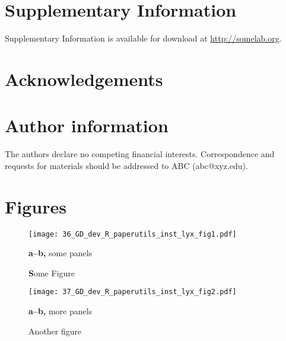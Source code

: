 \documentclass[11pt,british,super,sort&compress]{article}
\begin{document}
\section{Supplementary Information}

Supplementary Information is available for download at \url{http://somelab.org}.


\section{Acknowledgements}


\section{Author information}

The authors declare no competing financial interests. Correspondence
and requests for materials should be addressed to ABC (abc@xyz.edu).\newpage{}\pagestyle{empty}


\section{Figures}



\begin{figure*}[h]
\begin{centering}
\texttt{[image: 36\_GD\_dev\_R\_paperutils\_inst\_lyx\_fig1.pdf]}\caption{\label{fig:wt}\textbf{S}ome Figure}

\par\end{centering}

\textbf{\footnotesize a--b, }{\footnotesize some panels}
\end{figure*}


\newpage{}
\begin{figure*}[h]
\begin{centering}
\texttt{[image: 37\_GD\_dev\_R\_paperutils\_inst\_lyx\_fig2.pdf]}\caption{\label{fig:Or67d}Another figure}

\par\end{centering}

\textbf{\footnotesize a--b,}{\footnotesize{} more panels}
\end{figure*}


\newpage{}

\appendix
\pagestyle{plain}\setcounter{page}{1}\setcounter{figure}{0}\setcounter{table}{0}
\end{document}
